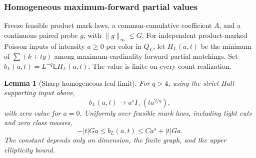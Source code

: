 \documentclass[11pt,reqno]{amsart}
\newtheorem{lemma}[theorem]{Lemma}
\theoremstyle{definition}
\theoremstyle{remark}
\numberwithin{equation}{section}
\newcommand{\E}{\mathbb E}
\begin{document}
\subsubsection{Homogeneous maximum-forward partial values}

Freeze feasible product mark laws, a common-cumulative coefficient
\(A\), and a continuous paired probe \(g\), with \(\|g\|_\infty\le G\).
For independent product-marked Poisson inputs of intensity \(a\ge0\)
per color in \(Q_L\), let \(H_L(a,t)\) be the minimum of
\(\sum(k+tg)\) among maximum-cardinality forward partial matchings.
Set \(b_L(a,t)=L^{-q}\E H_L(a,t)\). The value is finite on every
count realization.

\begin{lemma}[Sharp homogeneous leaf limit]
\label{measurable-forward-homogeneous}
For \(q>4\), using the strict-Hall supporting input above,
\begin{equation}
\label{measurable-forward-leaf-limit}
 b_L(a,t)\longrightarrow a^s I_+(t a^{2/q}),
\end{equation}
with zero value for \(a=0\). Uniformly over feasible mark laws,
including tight cuts and zero class masses,
\begin{equation}
\label{measurable-forward-leaf-bound}
       -|t|Ga\le b_L(a,t)\le C a^s+|t|Ga.
\end{equation}
The constant depends only on dimension, the finite graph, and the
upper ellipticity bound.
\end{lemma}
\end{document}
